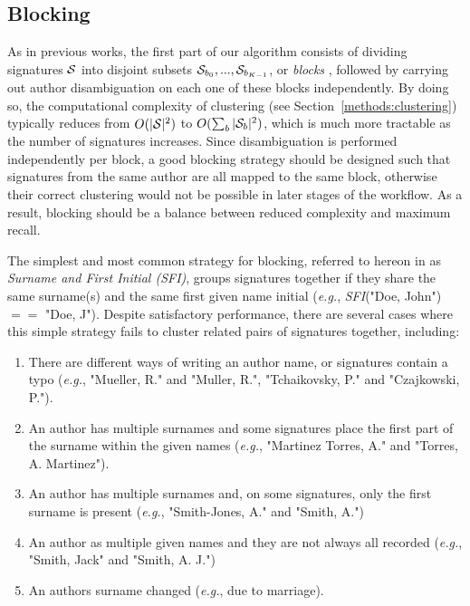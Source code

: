 \documentclass{article}
\newcommand{\eg}{\emph{e.g.}\xspace}
\begin{document}
\subsection{Blocking}
\label{methods:blocking}

As in previous works, the first part of our algorithm consists of dividing
signatures ${\cal S}$ into disjoint subsets ${\cal S}_{b_0}, ..., {\cal
S}_{b_{K-1}}$, or \textit{blocks} \citep{fellegi69}, followed by carrying out
author disambiguation on each one of these blocks independently.
By doing so, the computational complexity of clustering (see Section~\ref{methods:clustering})
typically reduces from $O(|{\cal S}|^2)$ to $O(\sum_b |{\cal S}_b|^2)$, which is much more
tractable as the number of signatures increases.
Since disambiguation is performed independently per block, a good blocking strategy should be
designed such that signatures from the same author are all mapped to the same
block, otherwise their correct clustering would not be possible in later stages of the workflow.
As a result, blocking should be a balance between reduced complexity and maximum recall.

The simplest and most common strategy for blocking, referred to hereon in as \textit{Surname and First Initial (SFI)},
groups signatures together if they share the same surname(s) and the same first
given name initial (\eg, \emph{SFI}("Doe, John") $==$ "Doe, J").
Despite satisfactory performance, there are several cases where this simple strategy fails to cluster related pairs of signatures together, including:

\begin{enumerate}
  \item There are different
  ways of writing an author name, or signatures contain a typo
  (\eg, "Mueller, R." and "Muller, R.", "Tchaikovsky, P." and "Czajkowski, P.").

  \item An author has multiple surnames and some signatures place the first part of the surname within the given names (\eg, "Martinez Torres, A." and "Torres, A. Martinez").

  \item An author has multiple surnames and, on some signatures, only the first surname is
  present (\eg, "Smith-Jones, A." and "Smith, A.")

  \item An author as multiple given names and they are not always all recorded (\eg,
  "Smith, Jack" and "Smith, A. J.")

  \item An authors surname changed (\eg, due to marriage).
\end{enumerate}
\end{document}
